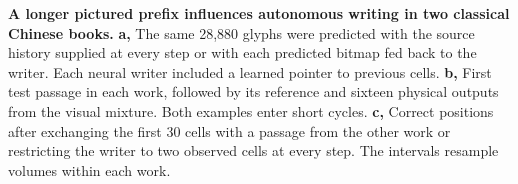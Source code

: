 \textbf{A longer pictured prefix influences autonomous writing in two classical Chinese books.} \textbf{a,} The same 28,880 glyphs were predicted with the source history supplied at every step or with each predicted bitmap fed back to the writer. Each neural writer included a learned pointer to previous cells. \textbf{b,} First test passage in each work, followed by its reference and sixteen physical outputs from the visual mixture. Both examples enter short cycles. \textbf{c,} Correct positions after exchanging the first 30 cells with a passage from the other work or restricting the writer to two observed cells at every step. The intervals resample volumes within each work.

